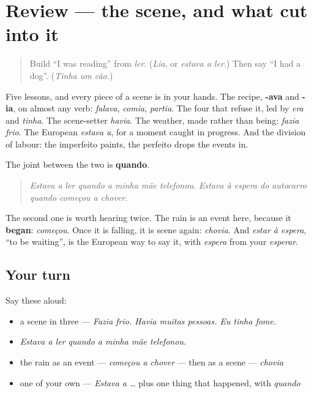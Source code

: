 \section[(review)]{Review — the scene, and what cut into it}

\label{lesson:PT-C259-revisao-quando}



\begin{quote}
Build \textquotedblleft{}I was reading\textquotedblright{} from \emph{ler}. (\emph{Lia}, or \emph{estava a ler}.) Then say \textquotedblleft{}I had a dog\textquotedblright{}. (\emph{Tinha um cão.})
\end{quote}

\begin{grammarlens}[title={What you've built}]
Five lessons, and every piece of a scene is in your hands. The recipe, \textbf{-ava} and \textbf{-ia}, on almost any verb: \emph{falava}, \emph{comia}, \emph{partia}. The four that refuse it, led by \emph{era} and \emph{tinha}. The scene-setter \emph{havia}. The weather, made rather than being: \emph{fazia frio}. The European \emph{estava a}, for a moment caught in progress. And the division of labour: the imperfeito paints, the perfeito drops the events in.

The joint between the two is \textbf{quando}.

\begin{quote}
\emph{Estava a ler quando a minha mãe telefonou.} \emph{Estava à espera do autocarro quando começou a chover.}
\end{quote}

The second one is worth hearing twice. The rain is an event here, because it \textbf{began}: \emph{começou}. Once it is falling, it is scene again: \emph{chovia}. And \emph{estar à espera}, \textquotedblleft{}to be waiting\textquotedblright{}, is the European way to say it, with \emph{espera} from your \emph{esperar}.
\end{grammarlens}

\subsection*{Your turn}
Say these aloud:

\begin{itemize}
\raggedright
  \item a scene in three — \emph{Fazia frio. Havia muitas pessoas. Eu tinha fome.}
  \item \emph{Estava a ler quando a minha mãe telefonou.}
  \item the rain as an event — \emph{começou a chover} — then as a scene — \emph{chovia}
  \item one of your own — \emph{Estava a …} plus one thing that happened, with \emph{quando}
\end{itemize}


